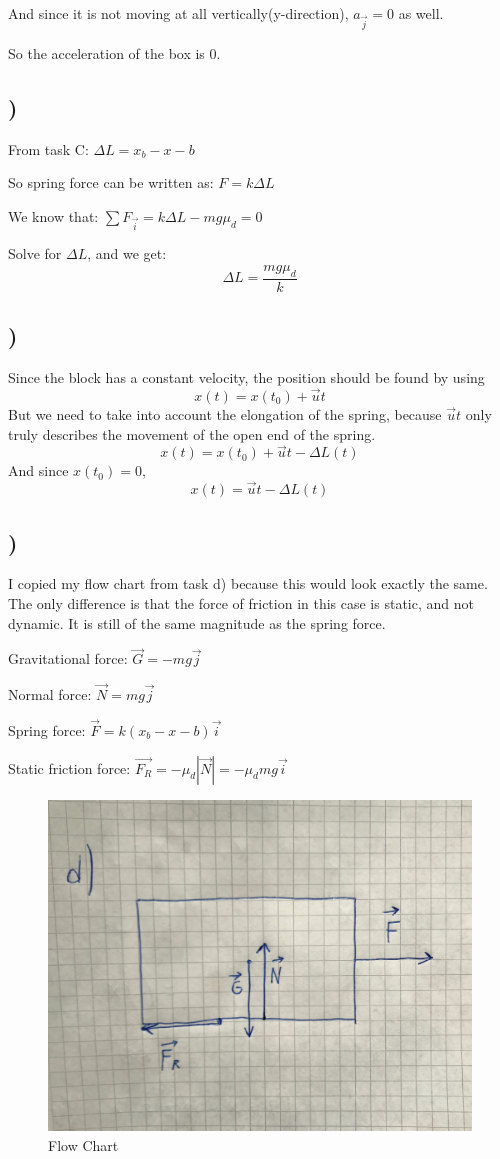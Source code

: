 \documentclass[a4paper,10pt,norsk]{article}
\begin{document}
And since it is not moving at all vertically(y-direction), $a_{\vec{j}} = 0$ as well.

So the acceleration of the box is 0.

\subsection{)}
From task C: $\Delta L = x_{b} - x - b$

So spring force can be written as: $F = k\Delta L$

We know that: $\sum F_{\vec{i}} = k\Delta L - mg\mu_{d} = 0$

Solve for $\Delta L$, and we get:
\[\Delta L = \frac{mg\mu_{d}}{k}\]


\subsection{)}
Since the block has a constant velocity, the position should be found by using
\[x(t) = x(t_{0}) + \vec{u}t\]
But we need to take into account the elongation of the spring, because $\vec{u}t$ only truly describes the movement of the open end of the spring.
\[x(t) = x(t_{0}) + \vec{u}t - \Delta L(t)\]
And since $x(t_{0}) = 0$, 
\[x(t) = \vec{u}t - \Delta L(t)\]

\subsection{)}
I copied my flow chart from task d) because this would look exactly the same.
The only difference is that the force of friction in this case is static, and not dynamic.
It is still of the same magnitude as the spring force.

Gravitational force: $\vec{G} = -mg\vec{j}$

Normal force: $\vec{N} = mg\vec{j}$

Spring force: $\vec{F} = k(x_{b} - x - b)\vec{i}$

Static friction force: $\vec{F_{R}} = -\mu_{d}|\vec{N}| = -\mu_{d} mg\vec{i}$

\begin{figure}[h!]
        \centering 
        \includegraphics[scale=0.4]{oppg_d.png} 
        \caption{Flow Chart}
\end{figure}
\end{document}
